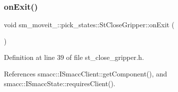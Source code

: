 \subsubsection{\texorpdfstring{on\+Exit()}{onExit()}}
{\footnotesize\ttfamily void sm\+\_\+moveit\+\_\+::pick\+\_\+states\+::\+St\+Close\+Gripper\+::on\+Exit (\begin{DoxyParamCaption}{ }\end{DoxyParamCaption})\hspace{0.3cm}{\ttfamily [inline]}}



Definition at line 39 of file st\+\_\+close\+\_\+gripper.\+h.



References smacc\+::\+I\+Smacc\+Client\+::get\+Component(), and smacc\+::\+I\+Smacc\+State\+::requires\+Client().


